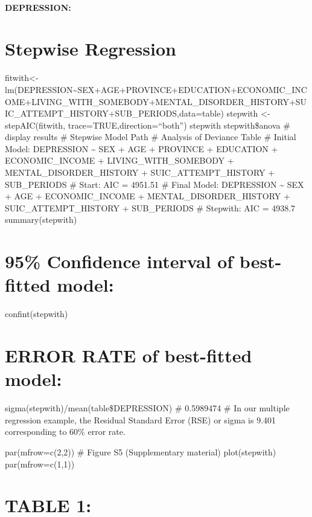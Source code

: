 \documentclass[
]{book}
\begin{document}
\hypertarget{depression-2}{%
\subsubsection{DEPRESSION:}\label{depression-2}}

\hypertarget{stepwise-regression}{%
\chapter{Stepwise Regression}\label{stepwise-regression}}

fitwith\textless-lm(DEPRESSION\textasciitilde SEX+AGE+PROVINCE+EDUCATION+ECONOMIC\_INCOME+LIVING\_WITH\_SOMEBODY+MENTAL\_DISORDER\_HISTORY+SUIC\_ATTEMPT\_HISTORY+SUB\_PERIODS,data=table)
stepwith \textless- stepAIC(fitwith, trace=TRUE,direction=``both'')
stepwith
stepwith\$anova \# display results
\# Stepwise Model Path
\# Analysis of Deviance Table
\# Initial Model: DEPRESSION \textasciitilde{} SEX + AGE + PROVINCE + EDUCATION + ECONOMIC\_INCOME + LIVING\_WITH\_SOMEBODY + MENTAL\_DISORDER\_HISTORY + SUIC\_ATTEMPT\_HISTORY + SUB\_PERIODS
\# Start: AIC = 4951.51
\# Final Model: DEPRESSION \textasciitilde{} SEX + AGE + ECONOMIC\_INCOME + MENTAL\_DISORDER\_HISTORY + SUIC\_ATTEMPT\_HISTORY + SUB\_PERIODS
\# Stepwith: AIC = 4938.7
summary(stepwith)

\hypertarget{confidence-interval-of-best-fitted-model}{%
\chapter{95\% Confidence interval of best-fitted model:}\label{confidence-interval-of-best-fitted-model}}

confint(stepwith)

\hypertarget{error-rate-of-best-fitted-model}{%
\chapter{ERROR RATE of best-fitted model:}\label{error-rate-of-best-fitted-model}}

sigma(stepwith)/mean(table\$DEPRESSION)
\# 0.5989474
\# In our multiple regression example, the Residual Standard Error (RSE) or sigma is 9.401 corresponding to 60\% error rate.

par(mfrow=c(2,2))
\# Figure S5 (Supplementary material)
plot(stepwith)
par(mfrow=c(1,1))

\hypertarget{table-1}{%
\chapter{TABLE 1:}\label{table-1}}
\end{document}
